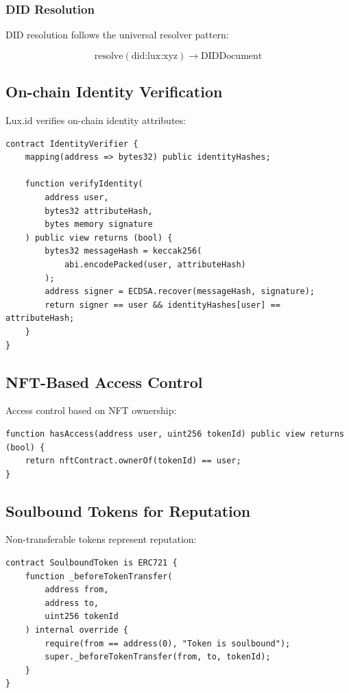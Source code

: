 \subsubsection{DID Resolution}

DID resolution follows the universal resolver pattern:

\begin{equation}
    \text{resolve}(\text{did:lux:xyz}) \rightarrow \text{DIDDocument}
\end{equation}

\subsection{On-chain Identity Verification}

Lux.id verifies on-chain identity attributes:

\begin{lstlisting}[language=Solidity]
contract IdentityVerifier {
    mapping(address => bytes32) public identityHashes;

    function verifyIdentity(
        address user,
        bytes32 attributeHash,
        bytes memory signature
    ) public view returns (bool) {
        bytes32 messageHash = keccak256(
            abi.encodePacked(user, attributeHash)
        );
        address signer = ECDSA.recover(messageHash, signature);
        return signer == user && identityHashes[user] == attributeHash;
    }
}
\end{lstlisting}

\subsection{NFT-Based Access Control}

Access control based on NFT ownership:

\begin{lstlisting}[language=Solidity]
function hasAccess(address user, uint256 tokenId) public view returns (bool) {
    return nftContract.ownerOf(tokenId) == user;
}
\end{lstlisting}

\subsection{Soulbound Tokens for Reputation}

Non-transferable tokens represent reputation:

\begin{lstlisting}[language=Solidity]
contract SoulboundToken is ERC721 {
    function _beforeTokenTransfer(
        address from,
        address to,
        uint256 tokenId
    ) internal override {
        require(from == address(0), "Token is soulbound");
        super._beforeTokenTransfer(from, to, tokenId);
    }
}
\end{lstlisting}


